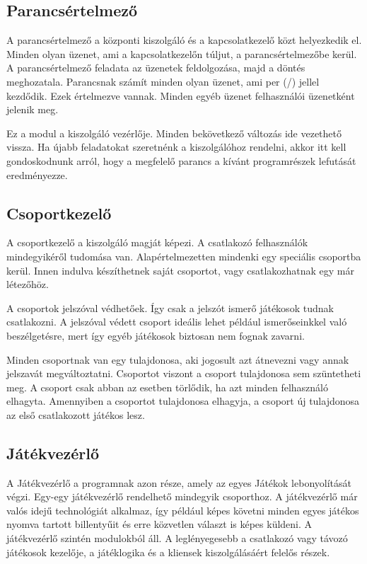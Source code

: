 \documentclass[]{article}
\begin{document}
\hypertarget{parancsuxe9rtelmezux151}{%
\subsection{Parancsértelmező}\label{parancsuxe9rtelmezux151}}

A parancsértelmező a központi kiszolgáló és a kapcsolatkezelő közt
helyezkedik el. Minden olyan üzenet, ami a kapcsolatkezelőn túljut, a
parancsértelmezőbe kerül. A parancsértelmező feladata az üzenetek
feldolgozása, majd a döntés meghozatala. Parancsnak számít minden olyan
üzenet, ami per (/) jellel kezdődik. Ezek értelmezve vannak. Minden
egyéb üzenet felhasználói üzenetként jelenik meg.

Ez a modul a kiszolgáló vezérlője. Minden bekövetkező változás ide
vezethető vissza. Ha újabb feladatokat szeretnénk a kiszolgálóhoz
rendelni, akkor itt kell gondoskodnunk arról, hogy a megfelelő parancs a
kívánt programrészek lefutását eredményezze.

\hypertarget{csoportkezelux151}{%
\subsection{Csoportkezelő}\label{csoportkezelux151}}

A csoportkezelő a kiszolgáló magját képezi. A csatlakozó felhasználók
mindegyikéről tudomása van. Alapértelmezetten mindenki egy speciális
csoportba kerül. Innen indulva készíthetnek saját csoportot, vagy
csatlakozhatnak egy már létezőhöz.

A csoportok jelszóval védhetőek. Így csak a jelszót ismerő játékosok
tudnak csatlakozni. A jelszóval védett csoport ideális lehet például
ismerőseinkkel való beszélgetésre, mert így egyéb játékosok biztosan nem
fognak zavarni.

Minden csoportnak van egy tulajdonosa, aki jogosult azt átnevezni vagy
annak jelszavát megváltoztatni. Csoportot viszont a csoport tulajdonosa
sem szüntetheti meg. A csoport csak abban az esetben törlődik, ha azt
minden felhasználó elhagyta. Amennyiben a csoportot tulajdonosa
elhagyja, a csoport új tulajdonosa az első csatlakozott játékos lesz.

\hypertarget{juxe1tuxe9kvezuxe9rlux151}{%
\subsection{Játékvezérlő}\label{juxe1tuxe9kvezuxe9rlux151}}

A Játékvezérlő a programnak azon része, amely az egyes Játékok
lebonyolítását végzi. Egy-egy játékvezérlő rendelhető mindegyik
csoporthoz. A játékvezérlő már valós idejű technológiát alkalmaz, így
például képes követni minden egyes játékos nyomva tartott billentyűit és
erre közvetlen választ is képes küldeni. A játékvezérlő szintén
modulokból áll. A leglényegesebb a csatlakozó vagy távozó játékosok
kezelője, a játéklogika és a kliensek kiszolgálásáért felelős részek.
\end{document}
